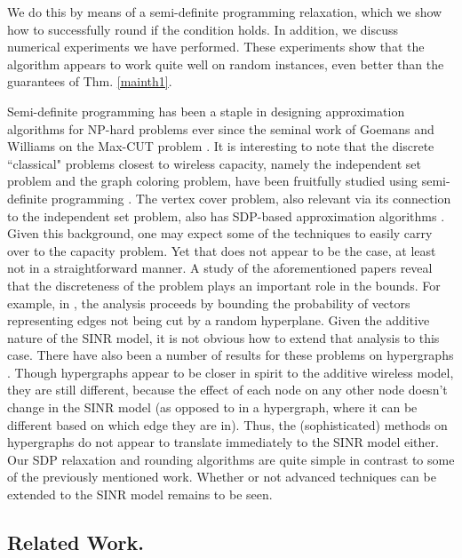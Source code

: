 \documentclass[11pt]{amsart}
\begin{document}
We do this by means of a semi-definite programming relaxation, which we show how to successfully round if the condition 
   holds. In addition, we discuss numerical experiments we have performed. These experiments show that the algorithm appears to work quite well on random instances, even better than the guarantees of
 Thm. \ref{mainth1}.
 
 Semi-definite programming has been a staple in designing approximation algorithms for NP-hard problems ever
 since the seminal work of Goemans and Williams on the Max-CUT problem \cite{Goemans:1995:IAA:227683.227684}. 
 It is interesting to note that the discrete ``classical" problems closest to wireless capacity, namely the independent set
 problem and the graph coloring problem, have been  fruitfully studied using semi-definite programming \cite{Halperin:2002:CK-:606216.606221,Karger:1998:AGC:274787.274791}. The vertex cover problem, also relevant via its connection
 to the independent set problem,  also has
SDP-based approximation algorithms 
\cite{Halperin:2000:IAA:338219.338269,Karakostas:2009:BAR:1597036.1597045}. Given this background, one may expect some of the techniques to easily carry over to the capacity
 problem. Yet that does not appear to be the case, at least not in a straightforward manner. A study of the aforementioned
 papers reveal that the discreteness of the problem plays an important role in the bounds. For example, in 
\cite{Karger:1998:AGC:274787.274791}, the analysis proceeds by bounding the probability of vectors representing edges not being cut by a random hyperplane. Given the additive nature of the SINR model, it is not obvious
how to extend that analysis to this case. There  have also been a number of results for these problems on hypergraphs \cite{Krivelevich:2001:ACM:365411.365469,DBLP:conf/focs/Chlamtac07,DBLP:conf/approx/ChlamtacS08}. Though hypergraphs appear to be closer in spirit to the additive wireless model, they
are still different, because the effect of each node on 
any other node doesn't change in the SINR model (as opposed to in a hypergraph, where it can be different based on which edge they are in). Thus, the (sophisticated) methods on hypergraphs 
do not appear to  translate immediately to the SINR model either. Our SDP relaxation and rounding algorithms are
quite simple in contrast to some of the previously mentioned work. Whether or not advanced techniques can be extended to the SINR model remains to be seen. 

 


\subsection{Related Work.}
\end{document}
